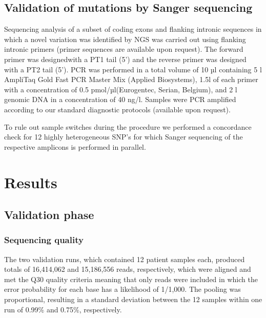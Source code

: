 \subsection{Validation of mutations by Sanger sequencing}
Sequencing analysis of a subset of coding exons and flanking intronic sequences in which a novel variation was identified by NGS was carried out using flanking intronic primers (primer sequences are available upon request). 
The forward primer was designedwith a PT1 tail (5') and the reverse primer was designed with a PT2 tail (5'). 
PCR was performed in a total volume of 10 µl containing 5 {\textmu}l AmpliTaq Gold {\textregistered}Fast PCR Master Mix (Applied Biosystems), 1.5{\textmu}l of each primer with a concentration of 0.5 pmol/µl(Eurogentec, Serian, Belgium), and 2 {\textmu}l genomic DNA in a concentration of 40 ng/{\textmu}l. 
Samples were PCR amplified according to our standard diagnostic protocols (available upon request). 

To rule out sample switches during the procedure we performed a concordance check for 12 highly heterogeneous SNP’s for which Sanger sequencing of the respective amplicons is performed in parallel.

\section{Results}\label{results}

\subsection{Validation phase}

\subsubsection{Sequencing quality}
The two validation runs, which contained 12 patient samples each, produced totals of 16,414,062 and 15,186,556 reads, respectively, which were aligned and met the Q30 quality criteria meaning that only reads were included in which the error probability for each base has a likelihood of 1/1,000. 
The pooling was proportional, resulting in a standard deviation between the 12 samples within one run of 0.99\% and 0.75\%, respectively. 

